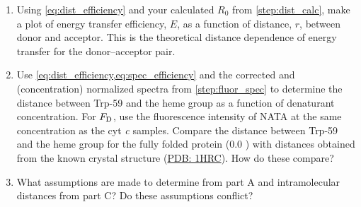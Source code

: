 \documentclass[nobib,nofonts,nols,nohyper]{tufte-handout}
\begin{document}
\begin{enumerate}
  \item Using \cref{eq:dist_efficiency} and your calculated \( R_0 \) from \cref{step:dist_calc}, make a plot of energy transfer efficiency, \( E \), as a function of distance, \( r \), between donor and acceptor. 
  This is the theoretical distance dependence of energy transfer for the donor--acceptor pair. 
  \item Use \cref{eq:dist_efficiency,eq:spec_efficiency} and the corrected and (concentration) normalized spectra from \cref{step:fluor_spec} to determine the distance between Trp-59 and the heme group as a function of denaturant concentration. 
  For \( F_{\textnormal{D}} \), use the fluorescence intensity of NATA at the same concentration as the cyt \emph{c} samples. 
  Compare the distance between Trp-59 and the heme group for the fully folded protein (\SI{0.0}{\Molar} ) with distances obtained from the known crystal structure (\href{https://www.rcsb.org/structure/1hrc}{PDB: 1HRC}). 
  How do these compare?
  \item What assumptions are made to determine \gibbs*[subscript-right=\ch{H2O}]{} from part A and intramolecular distances from part C\@? 
  Do these assumptions conflict?
\end{enumerate}



\nocite{*}
\printbibliography[category=cited]%

\printbibliography[%
	env=nolabelbib,%
  title={Further Reading},%
	resetnumbers,%
	labelprefix=F,%
	notcategory=cited,%
	]
\end{document}
